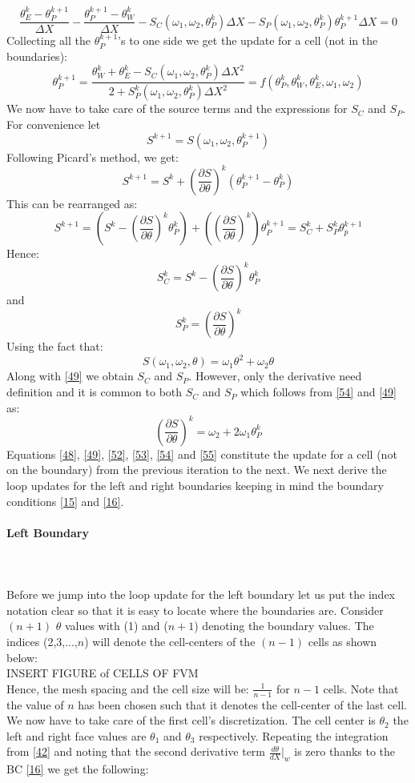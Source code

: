 \documentclass[12pt]{article}
\newcommand{\subsubsubsection}[1]{\paragraph{#1}\mbox{}\\}
\begin{document}
\[
\frac{\theta_E^k - \theta_P^{k+1}}{\Delta X} - \frac{\theta_P^{k+1} - \theta_W^k}{\Delta X} - S_C(\omega_1, \omega_2, \theta_P^k) \Delta X - S_P(\omega_1, \omega_2, \theta_P^k) \theta_P^{k+1} \Delta X= 0 \tag{47} \label{47} 
\]
Collecting all the $\theta_P^{k+1}$'s to one side we get the update for a cell (not in the boundaries): 
\[
\theta_P^{k+1} = \frac{\theta_W^k+\theta_E^k -S_C(\omega_1, \omega_2,\theta_P^k) \Delta X^2}{2+S_P^k(\omega_1, \omega_2, \theta_P^k) \Delta X^2} = f(\theta_P^k,\theta_W^k, \theta_E^k,\omega_1, \omega_2) \tag{48} \label{48}
\]
We now have to take care of the source terms and the expressions for $S_C$ and $S_P$. For convenience let
\[
S^{k+1} = S(\omega_1, \omega_2, \theta_P^{k+1}) \tag{49} \label{49}
\]
Following Picard's method, we get: 
\[
S^{k+1} = S^k + \left(\frac{\partial S}{\partial \theta}\right)^k (\theta_P^{k+1} - \theta_P^k) \tag{50} \label{50}
\]
This can be rearranged as: 
\[
S^{k+1} = \left(S^k-\left(\frac{\partial S}{\partial \theta}\right)^k \theta_P^k\right) + \left(\left(\frac{\partial S}{\partial \theta}\right)^k \right) \theta_P^{k+1} = S_C^k + S_P^k \theta_p^{k+1} \tag{51} \label{51} 
\]
Hence: 
\[
S_C^k = S^k-\left(\frac{\partial S}{\partial \theta}\right)^k \theta_P^k \tag{52} \label{52}
\]
and
\[
S_P^k = \left(\frac{\partial S}{\partial \theta}\right)^k \tag{53} \label{53}
\]
Using the fact that:
\[
S(\omega_1, \omega_2, \theta) = \omega_1 \theta^2 + \omega_2 \theta \tag{54} \label{54}
\]
Along with \eqref{49} we obtain $S_C$ and $S_P$. However, only the derivative need definition and it is common to both $S_C$ and $S_P$ which follows from \eqref{54} and \eqref{49} as:
\[
\left(\frac{\partial S}{\partial \theta}\right)^k = \omega_2 + 2 \omega_1 \theta_P^k \tag{55} \label{55}
\]
Equations \eqref{48}, \eqref{49}, \eqref{52}, \eqref{53}, \eqref{54} and \eqref{55} constitute the update for a cell (not on the boundary) from the previous iteration to the next. We next derive the loop updates for the left and right boundaries keeping in mind the boundary conditions \eqref{15} and \eqref{16}. 
\subsubsubsection{Left Boundary} 
\\
Before we jump into the loop update for the left boundary let us put the index notation clear so that it is easy to locate where the boundaries are. Consider $(n+1)$ $\theta$ values with (1) and ($n+1$) denoting the boundary values. The indices (2,3,...,$n$) will denote the cell-centers of the $(n-1)$ cells as shown below: 
\\
INSERT FIGURE of CELLS OF FVM 
\\
Hence, the mesh spacing and the cell size will be: $\frac{1}{n-1}$ for $n-1$ cells. Note that the value of $n$ has been chosen such that it denotes the cell-center of the last cell. We now have to take care of the first cell's discretization. The cell center is $\theta_2$ the left and right face values are $\theta_1$ and $\theta_3$ respectively. Repeating the integration from \eqref{42} and noting that the second derivative term $\frac{d\theta}{dX}\Bigr|_w$ is zero thanks to the BC \eqref{16} we get the following: 
\end{document}
